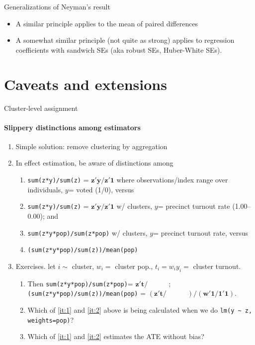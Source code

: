 \begin{frame}{Generalizations of Neyman's result}

  \begin{itemize}
  \item A similar principle applies to the mean of paired differences
  \item A somewhat similar principle (not quite as strong) applies to
    regression coefficients with sandwich SEs (aka robust SEs,
    Huber-White SEs). 
  \end{itemize}
  
\end{frame}
\section{Caveats and extensions}
\begin{frame}
  
\end{frame}
\begin{frame}{Cluster-level assignment}
\framesubtitle{Slippery distinctions among estimators}
  \begin{enumerate}
  \item Simple solution: remove clustering by aggregation
\item<2-> In effect estimation, be aware of distinctions among
  \begin{enumerate}
    \item \texttt{sum(z*y)/sum(z)} = $\mathbf{z}'\mathbf{y}/\mathbf{z}'\mathbf{1}$  where observations/index range over individuals, $y$= voted (1/0), versus
  \item \texttt{sum(z*y)/sum(z)} = $\mathbf{z}'\mathbf{y}/\mathbf{z}'\mathbf{1}$ w/ clusters,  $y$= precinct turnout rate (1.00--0.00); and 
  \item \texttt{sum(z*y*pop)/sum(z*pop)} w/ clusters, $y$= precinct turnout rate, versus \label{it:1}
  \item \texttt{(sum(z*y*pop)/sum(z))/mean(pop)} \label{it:2}
  \end{enumerate}
\item<3-> Exercises. let $i \sim $ cluster, $w_i =$ cluster pop., $t_i = w_iy_i = $ cluster turnout.
\begin{enumerate}
\item   Then \texttt{sum(z*y*pop)/sum(z*pop)}= $\mathbf{z}'\mathbf{t}/\hspace{3em}$; \texttt{(sum(z*y*pop)/sum(z))/mean(pop)} = $\left(\mathbf{z}'\mathbf{t}/\hspace{3em}\right)/\left(\mathbf{w}'\mathbf{1}/\mathbf{1}'\mathbf{1}\right)$.
  \item Which of \ref{it:1} and \ref{it:2} above is being calculated when we do \texttt{lm(y \textasciitilde\ z, weights=pop)}?
  \item Which of \ref{it:1} and \ref{it:2} estimates the ATE without bias? 
  \end{enumerate}
  \end{enumerate}

\end{frame}

